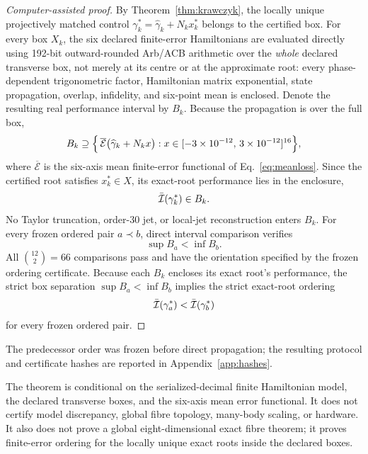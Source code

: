 \begin{proof}[Computer-assisted proof]
By Theorem~\ref{thm:krawczyk}, the locally unique projectively matched control
$\gamma^{\ast}_{k}=\widehat{\gamma}_{k}+N_{k}x^{\ast}_{k}$ belongs to the certified box.
For every box $X_{k}$, the six declared finite-error Hamiltonians are evaluated directly
using 192-bit outward-rounded Arb/ACB arithmetic over the \emph{whole} declared transverse
box, not merely at its centre or at the approximate root: every phase-dependent
trigonometric factor, Hamiltonian matrix exponential, state propagation, overlap,
infidelity, and six-point mean is enclosed. Denote the resulting real performance interval
by $B_{k}$. Because the propagation is over the full box,
\[
B_{k}\supseteq
\Bigl\{\,\overline{\mathcal{E}}\bigl(\widehat{\gamma}_{k}+N_{k}x\bigr):
x\in[-3\times10^{-12},\,3\times10^{-12}]^{16}\Bigr\},
\]
where $\overline{\mathcal{E}}$ is the six-axis mean finite-error functional of
Eq.~\eqref{eq:meanloss}. Since the certified root satisfies $x^{\ast}_{k}\in X$, its
exact-root performance lies in the enclosure,
\[
\bar{\mathcal{I}}(\gamma^{\ast}_{k})\in B_{k}.
\]
No Taylor truncation, order-30 jet, or local-jet reconstruction enters $B_{k}$. For every
frozen ordered pair $a\prec b$, direct interval comparison verifies
\[
\sup B_{a}<\inf B_{b}.
\]
All $\binom{12}{2}=66$ comparisons pass and have the orientation specified by the frozen
ordering certificate. Because each $B_{k}$ encloses its exact root's performance, the
strict box separation $\sup B_{a}<\inf B_{b}$ implies the strict exact-root ordering
\[
\bar{\mathcal{I}}(\gamma^{\ast}_{a})<\bar{\mathcal{I}}(\gamma^{\ast}_{b})
\]
for every frozen ordered pair.
\end{proof}

The predecessor order was frozen before direct propagation; the resulting protocol and
certificate hashes are reported in Appendix~\ref{app:hashes}.

\begin{remark}
The theorem is conditional on the serialized-decimal finite Hamiltonian model, the declared
transverse boxes, and the six-axis mean error functional. It does not certify model
discrepancy, global fibre topology, many-body scaling, or hardware. It also does not prove
a global eight-dimensional exact fibre theorem; it proves finite-error ordering for the
locally unique exact roots inside the declared boxes.
\end{remark}

